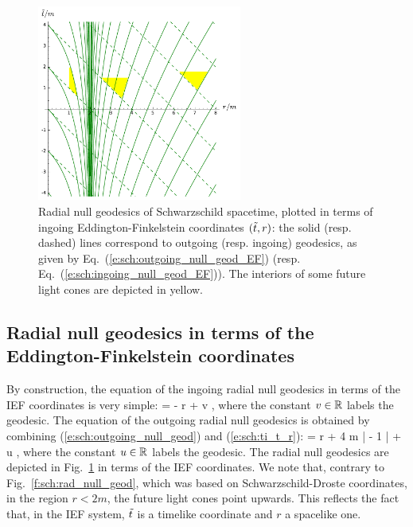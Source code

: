 \begin{figure}
\centerline{\includegraphics[width=0.6\textwidth]{sch_rad_null_geod_EF.pdf}}
\caption[]{\label{f:sch:rad_null_geod_EF} \footnotesize
Radial null geodesics of Schwarzschild spacetime, plotted in terms
of ingoing Eddington-Finkelstein coordinates $({\tilde t},r)$: the solid (resp. dashed) lines
correspond to outgoing (resp. ingoing) geodesics, as given by Eq.~(\ref{e:sch:outgoing_null_geod_EF})
(resp. Eq.~(\ref{e:sch:ingoing_null_geod_EF})). The interiors of some future light
cones are depicted in yellow.}
\end{figure}

\subsection{Radial null geodesics in terms of the Eddington-Finkelstein coordinates}

By construction, the equation of the ingoing radial null geodesics
in terms of the IEF coordinates is very simple:
\be \label{e:sch:ingoing_null_geod_EF}
    \ti = - r + v ,
\ee
where the constant $v\in \mathbb{R}$ labels the geodesic.
The equation of the outgoing radial null geodesics is obtained
by combining (\ref{e:sch:outgoing_null_geod}) and (\ref{e:sch:ti_t_r}):
\be \label{e:sch:outgoing_null_geod_EF}
    \ti = r + 4 m \ln \left|  - 1 \right| + u ,
\ee
where the constant $u\in \mathbb{R}$ labels the geodesic.
The radial null geodesics are depicted in Fig.~\ref{f:sch:rad_null_geod_EF}
in terms of the IEF coordinates. We note that, contrary to Fig.~\ref{f:sch:rad_null_geod},
which was based on Schwarzschild-Droste coordinates, in the region $r<2m$,
the future light cones point upwards. This reflects the fact that, in the IEF system,
${\tilde t}$ is a timelike coordinate and $r$ a spacelike one.

